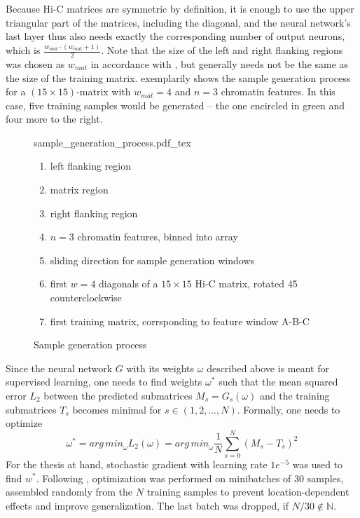 Because Hi-C matrices are symmetric by definition, it is enough to use the upper triangular part of the matrices, including the diagonal,
and the neural network's last layer thus also needs exactly the corresponding number of output neurons, which is $\frac{w_{mat} \cdot (w_{mat}+1)}{2}$.
Note that the size of the left and right flanking regions was chosen as $w_{mat}$ in accordance with \cite{Farre2018a},
but generally needs not be the same as the size of the training matrix. 
 exemplarily shows the sample generation process for a $(15\times15)$-matrix with $w_{mat}=4$ and $n=3$ chromatin features.
In this case, five training samples would be generated -- the one encircled in green and four more to the right.
\begin{figure}
 \begin{minipage}{0.60\textwidth}
   \centering
    \small
    {sample_generation_process.pdf_tex}
    \caption{Sample generation process}
    \label{fig:methods:sample_gen}
 \end{minipage}\hfill
 \begin{minipage}{0.3\textwidth}
 \scriptsize
  \begin{enumerate}[label=\Alph*:]
   \raggedright
    \item left flanking region
    \item matrix region
    \item right flanking region
    \item $n=3$ chromatin features, binned into array
    \item sliding direction for sample generation windows
    \item first $w=4$ diagonals of a $15\times15$ Hi-C matrix, rotated \SI{45}{\deg} counterclockwise
    \item first training matrix, corrsponding to feature window A-B-C
\end{enumerate}
 \end{minipage}


\end{figure}


Since the neural network $G$ with its weights $\omega$ described above is meant for supervised learning, 
one needs to find weights $\omega^*$ such that the mean squared error $L_2$ 
between the predicted submatrices $M_s = G_s(\omega)$ and the training submatrices $T_s$
becomes minimal for $s \in (1,2,\dots, N)$. 
Formally, one needs to optimize
\begin{equation}
 \omega^* = {arg\,min}_\omega L_2(\omega) = {arg\,min}_\omega \frac{1}{N} \sum_{s=0}^N (M_s - T_s)^2 \label{eq:methods:nn-mse}
\end{equation} 
For the thesis at hand, stochastic gradient with learning rate $1e^{-5}$  was used to find $w^*$.
Following \cite{Farre2018a}, optimization was performed on minibatches of 30 samples, assembled randomly from the $N$ training samples
to prevent location-dependent effects and improve generalization.
The last batch was dropped, if $N/30 \not \in \mathbb{N}$. 

